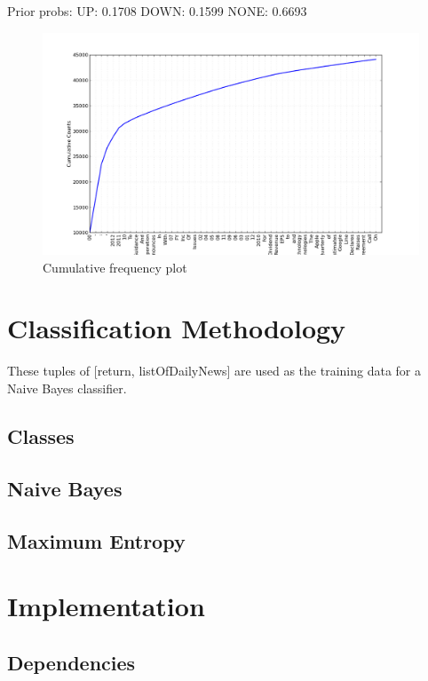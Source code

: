 \documentclass[]{article}
\begin{document}
Prior probs:
UP: 0.1708
DOWN: 0.1599
NONE:  0.6693

\begin{figure}[h!]
\centering
\includegraphics[scale=0.25]{cum_graph.png}
\caption{Cumulative frequency plot}
\end{figure}
\section{Classification Methodology}
These tuples of [return, listOfDailyNews] are used as the training data for a Naive Bayes classifier. 
\subsection{Classes}

\subsection{Naive Bayes}
\subsection{Maximum Entropy}

\section{Implementation}

\subsection{Dependencies}
\end{document}
